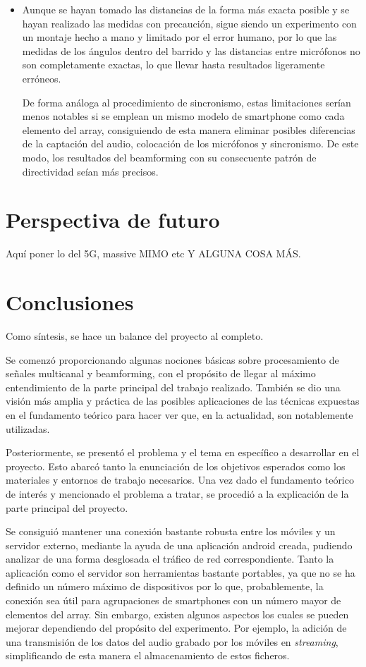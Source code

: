 \documentclass[a4paper,11pt]{book}
\begin{document}
\begin{itemize}
\item Aunque se hayan tomado las distancias de la forma más exacta posible y se hayan realizado las medidas con precaución, sigue siendo un experimento con un montaje hecho a mano y limitado por el error humano, por lo que las medidas de los ángulos dentro del barrido y las distancias entre micrófonos no son completamente exactas, lo que llevar hasta resultados ligeramente erróneos.

De forma análoga al procedimiento de sincronismo, estas limitaciones serían menos notables si se emplean un mismo modelo de smartphone como cada elemento del array, consiguiendo de esta manera eliminar posibles diferencias de la captación del audio, colocación de los micrófonos y sincronismo. De este modo, los resultados del beamforming con su consecuente patrón de directividad seían más precisos.
\end{itemize}


\chapter{Perspectiva de futuro}
Aquí poner lo del 5G, massive MIMO etc Y ALGUNA COSA MÁS.


\chapter{Conclusiones}
Como síntesis, se hace un balance del proyecto al completo.

Se comenzó proporcionando algunas nociones básicas sobre procesamiento de señales multicanal y beamforming, con el propósito de llegar al máximo entendimiento de la parte principal del trabajo realizado. También se dio una visión más amplia y práctica de las posibles aplicaciones de las técnicas expuestas en el fundamento teórico para hacer ver que, en la actualidad, son notablemente utilizadas.

Posteriormente, se presentó el problema y el tema en específico a desarrollar en el proyecto. Esto abarcó tanto la enunciación de los objetivos esperados como los materiales y entornos de trabajo necesarios. Una vez dado el fundamento teórico de interés y mencionado el problema a tratar, se procedió a la explicación de la parte principal del proyecto.

 Se consiguió mantener una conexión bastante robusta entre los móviles y un servidor externo, mediante la ayuda de una aplicación android creada, pudiendo analizar de una forma desglosada el tráfico de red correspondiente. Tanto la aplicación como el servidor son herramientas bastante portables, ya que no se ha definido un número máximo de dispositivos por lo que, probablemente, la conexión sea útil para agrupaciones de smartphones con un número mayor de elementos del array. Sin embargo, existen algunos aspectos los cuales se pueden mejorar dependiendo del propósito del experimento. Por ejemplo, la adición de una transmisión de los datos del audio grabado por los móviles en \textit{streaming}, simplificando de esta manera el almacenamiento de estos ficheros.
 
\end{document}

